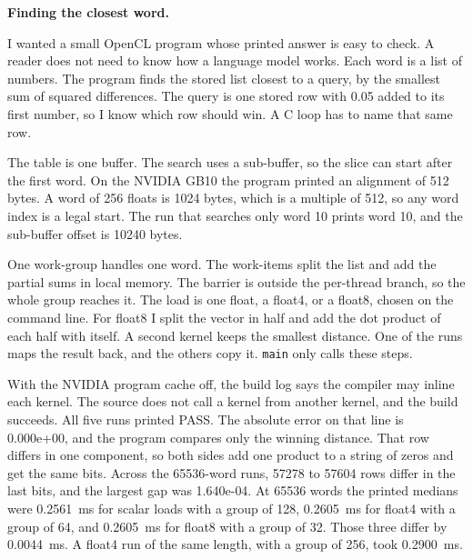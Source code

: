 \documentclass[12pt,letterpaper]{article}
\begin{document}
\noindent\textbf{Finding the closest word.}

I wanted a small OpenCL program whose printed answer is easy to check. A reader does not need to know how a language model works. Each word is a list of numbers. The program finds the stored list closest to a query, by the smallest sum of squared differences. The query is one stored row with 0.05 added to its first number, so I know which row should win. A C loop has to name that same row.

The table is one buffer. The search uses a sub-buffer, so the slice can start after the first word. On the NVIDIA GB10 the program printed an alignment of 512 bytes. A word of 256 floats is 1024 bytes, which is a multiple of 512, so any word index is a legal start. The run that searches only word 10 prints word 10, and the sub-buffer offset is 10240 bytes.

One work-group handles one word. The work-items split the list and add the partial sums in local memory. The barrier is outside the per-thread branch, so the whole group reaches it. The load is one float, a float4, or a float8, chosen on the command line. For float8 I split the vector in half and add the dot product of each half with itself. A second kernel keeps the smallest distance. One of the runs maps the result back, and the others copy it. \texttt{main} only calls these steps.

With the NVIDIA program cache off, the build log says the compiler may inline each kernel. The source does not call a kernel from another kernel, and the build succeeds. All five runs printed PASS. The absolute error on that line is 0.000e+00, and the program compares only the winning distance. That row differs in one component, so both sides add one product to a string of zeros and get the same bits. Across the 65536-word runs, 57278 to 57604 rows differ in the last bits, and the largest gap was 1.640e-04. At 65536 words the printed medians were 0.2561~ms for scalar loads with a group of 128, 0.2605~ms for float4 with a group of 64, and 0.2605~ms for float8 with a group of 32. Those three differ by 0.0044~ms. A float4 run of the same length, with a group of 256, took 0.2900~ms.
\end{document}

